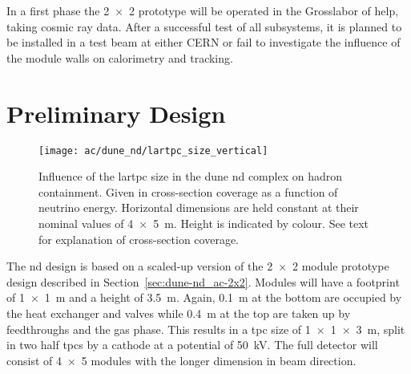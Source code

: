 In a first phase the \num{2 x 2} prototype will be operated in the Grosslabor of \gls{help}, taking cosmic ray data.
After a successful test of all subsystems, it is planned to be installed in a test beam at either CERN or \gls{fail} to investigate the influence of the module walls on calorimetry and tracking.


\section{Preliminary \AC{}  Design}
\label{sec:dune-nd_ac-nd}

\begin{figure}[tbp]
	\centering
	\texttt{[image: ac/dune\_nd/lartpc\_size\_vertical]}
	\caption[\AC{}   hadron containment]{%
		Influence of the \acrshort{lartpc} size in the \acrshort{dune} \acrshort{nd} complex on hadron containment.
		Given in cross-section coverage as a function of neutrino energy.
		Horizontal dimensions are held constant at their nominal values of \SI{4 x 5}{\metre}.
		Height is indicated by colour.
		See text for explanation of cross-section coverage.~\cite{lartpcSizeChris}
	}
	\label{fig:dune-nd_lartpc-size}
\end{figure}

The \AC{} \gls{nd} design is based on a scaled-up version of the \num{2 x 2} module prototype design described in Section~\ref{sec:dune-nd_ac-2x2}.
Modules will have a footprint of \SI{1 x 1}{\metre} and a height of \SI{3.5}{\metre}.
Again, \SI{0.1}{\metre} at the bottom are occupied by the heat exchanger and valves while \SI{0.4}{\metre} at the top are taken up by feedthroughs and the gas phase.
This results in a \gls{tpc} size of \SI{1 x 1 x 3}{\metre}, split in two half \glspl{tpc} by a cathode at a potential of \SI{50}{\kilo\volt}.
The full detector will consist of \num{4 x 5} modules with the longer dimension in beam direction.


